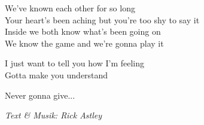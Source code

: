 \newpage
We've known each other for so long\\
Your heart's been aching but you're too shy to say it\\
Inside we both know what's been going on\\
We know the game and we're gonna play it\par
\vspace{10pt}
I just want to tell you how I'm feeling\\
Gotta make you understand\par
\vspace{10pt}
Never gonna give...\par%
\vspace{10pt}
{\footnotesize\textit{Text \& Musik: Rick Astley}}
